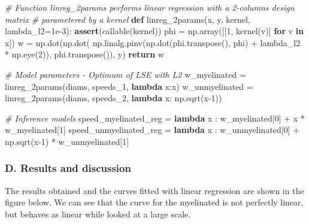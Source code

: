 \documentclass[]{article}
\newenvironment{Shaded}{}{}
\newcommand{\BuiltInTok}[1]{#1}
\newcommand{\CommentTok}[1]{\textcolor[rgb]{0.38,0.63,0.69}{\textit{#1}}}
\newcommand{\ControlFlowTok}[1]{\textcolor[rgb]{0.00,0.44,0.13}{\textbf{#1}}}
\newcommand{\DecValTok}[1]{\textcolor[rgb]{0.25,0.63,0.44}{#1}}
\newcommand{\FloatTok}[1]{\textcolor[rgb]{0.25,0.63,0.44}{#1}}
\newcommand{\KeywordTok}[1]{\textcolor[rgb]{0.00,0.44,0.13}{\textbf{#1}}}
\newcommand{\NormalTok}[1]{#1}
\newcommand{\OperatorTok}[1]{\textcolor[rgb]{0.40,0.40,0.40}{#1}}
\begin{document}
\begin{Shaded}
\begin{Highlighting}[]
\CommentTok{# Function linreg_2params performs linear regression with a 2-columns design matrix }
\CommentTok{# parametered by a kernel}
\KeywordTok{def}\NormalTok{ linreg_2params(x, y, kernel, lambda_l2}\OperatorTok{=}\FloatTok{1e-3}\NormalTok{): }
    \ControlFlowTok{assert}\NormalTok{(}\BuiltInTok{callable}\NormalTok{(kernel))}
\NormalTok{    phi }\OperatorTok{=}\NormalTok{ np.array([[}\DecValTok{1}\NormalTok{, kernel(v)] }\ControlFlowTok{for}\NormalTok{ v }\KeywordTok{in}\NormalTok{ x])}
\NormalTok{    w }\OperatorTok{=}\NormalTok{ np.dot(np.dot(}
\NormalTok{            np.linalg.pinv(np.dot(phi.transpose(), phi) }\OperatorTok{+}\NormalTok{ lambda_l2 }\OperatorTok{*}\NormalTok{ np.eye(}\DecValTok{2}\NormalTok{)), }
\NormalTok{            phi.transpose()), y)}
    \ControlFlowTok{return}\NormalTok{ w}

\CommentTok{# Model parameters - Optimum of LSE with L2 }
\NormalTok{w_myelinated }\OperatorTok{=}\NormalTok{ linreg_2params(diams, speeds_1, }\KeywordTok{lambda}\NormalTok{ x:x)}
\NormalTok{w_unmyelinated }\OperatorTok{=}\NormalTok{ linreg_2params(diams, speeds_2, }\KeywordTok{lambda}\NormalTok{ x: np.sqrt(x}\DecValTok{-1}\NormalTok{))}

\CommentTok{# Inference models}
\NormalTok{speed_myelinated_reg }\OperatorTok{=} \KeywordTok{lambda}\NormalTok{ x : w_myelinated[}\DecValTok{0}\NormalTok{] }\OperatorTok{+}\NormalTok{ x }\OperatorTok{*}\NormalTok{ w_myelinated[}\DecValTok{1}\NormalTok{]}
\NormalTok{speed_unmyelinated_reg }\OperatorTok{=} \KeywordTok{lambda}\NormalTok{ x : w_unmyelinated[}\DecValTok{0}\NormalTok{] }\OperatorTok{+}\NormalTok{ np.sqrt(x}\DecValTok{-1}\NormalTok{) }\OperatorTok{*}\NormalTok{ w_unmyelinated[}\DecValTok{1}\NormalTok{]}
\end{Highlighting}
\end{Shaded}

\hypertarget{d.-results-and-discussion}{%
\subsubsection{D. Results and
discussion}\label{d.-results-and-discussion}}

The results obtained and the curves fitted with linear regression are
shown in the figure below. We can see that the curve for the myelinated
is not perfectly linear, but behaves as linear while looked at a large
scale.
\end{document}
